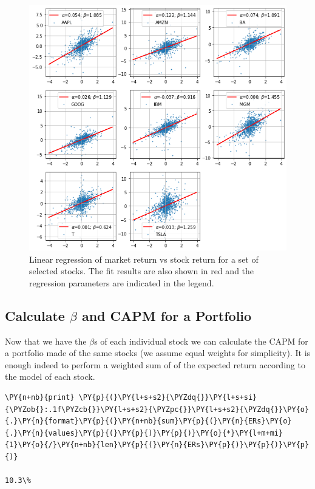 \begin{figure}[htb]
	\centering
	\includegraphics[width=.8\textwidth]{figures/capm_fit.png}
	\caption{Linear regression of market return vs stock return for a set of selected stocks. The fit results are also shown in red and the regression parameters are indicated in the legend.}
	\label{fig:capm_fit}
\end{figure}

\subsection{Calculate $\beta$ and CAPM for a Portfolio}

Now that we have the $\beta$s of each individual stock we can calculate the CAPM for a portfolio made of the same stocks (we assume equal weights for simplicity).
It is enough indeed to perform a weighted sum of of the expected return according to the model of each stock.

\begin{codebox}
\begin{Verbatim}[commandchars=\\\{\}]
\PY{n+nb}{print} \PY{p}{(}\PY{l+s+s2}{\PYZdq{}}\PY{l+s+si}{\PYZob{}:.1f\PYZcb{}}\PY{l+s+s2}{\PYZpc{}}\PY{l+s+s2}{\PYZdq{}}\PY{o}{.}\PY{n}{format}\PY{p}{(}\PY{n+nb}{sum}\PY{p}{(}\PY{n}{ERs}\PY{o}{.}\PY{n}{values}\PY{p}{(}\PY{p}{)}\PY{p}{)}\PY{o}{*}\PY{l+m+mi}{1}\PY{o}{/}\PY{n+nb}{len}\PY{p}{(}\PY{n}{ERs}\PY{p}{)}\PY{p}{)}\PY{p}{)}

10.3\%
\end{Verbatim}
\end{codebox}

